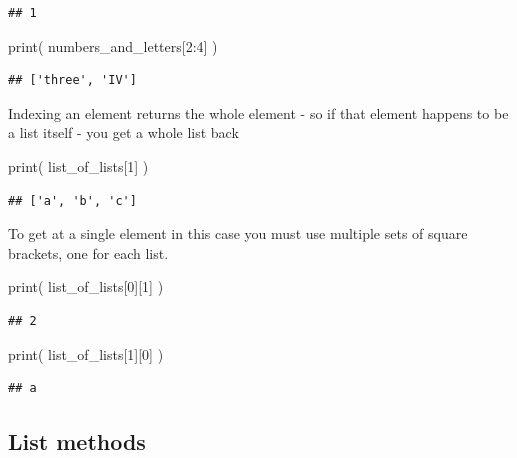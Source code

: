 \documentclass[]{book}
\newenvironment{Shaded}{\begin{snugshade}}{\end{snugshade}}
\newcommand{\BuiltInTok}[1]{#1}
\newcommand{\DecValTok}[1]{\textcolor[rgb]{0.00,0.00,0.81}{#1}}
\newcommand{\NormalTok}[1]{#1}
\theoremstyle{definition}
\theoremstyle{definition}
\theoremstyle{definition}
\theoremstyle{remark}
\begin{document}
\begin{verbatim}
## 1
\end{verbatim}

\begin{Shaded}
\begin{Highlighting}[]
\BuiltInTok{print}\NormalTok{( numbers_and_letters[}\DecValTok{2}\NormalTok{:}\DecValTok{4}\NormalTok{] )}
\end{Highlighting}
\end{Shaded}

\begin{verbatim}
## ['three', 'IV']
\end{verbatim}

Indexing an element returns the whole element - so if that element
happens to be a list itself - you get a whole list back

\begin{Shaded}
\begin{Highlighting}[]
\BuiltInTok{print}\NormalTok{( list_of_lists[}\DecValTok{1}\NormalTok{] )}
\end{Highlighting}
\end{Shaded}

\begin{verbatim}
## ['a', 'b', 'c']
\end{verbatim}

To get at a single element in this case you must use multiple sets of
square brackets, one for each list.

\begin{Shaded}
\begin{Highlighting}[]
\BuiltInTok{print}\NormalTok{( list_of_lists[}\DecValTok{0}\NormalTok{][}\DecValTok{1}\NormalTok{] )}
\end{Highlighting}
\end{Shaded}

\begin{verbatim}
## 2
\end{verbatim}

\begin{Shaded}
\begin{Highlighting}[]
\BuiltInTok{print}\NormalTok{( list_of_lists[}\DecValTok{1}\NormalTok{][}\DecValTok{0}\NormalTok{] )}
\end{Highlighting}
\end{Shaded}

\begin{verbatim}
## a
\end{verbatim}

\hypertarget{list-methods}{%
\subsection{List methods}\label{list-methods}}
\end{document}
